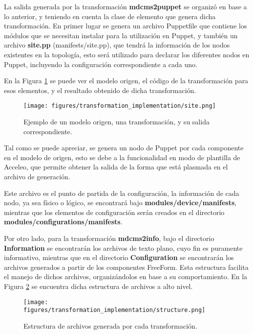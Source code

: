 La salida generada por la transformación \textbf{mdcms2puppet} se organizó en base a lo anterior, y teniendo en cuenta la clase de elemento que genera dicha transformación. En primer lugar se genera un archivo Puppetfile que contiene los módulos que se necesitan instalar para la utilización en Puppet, y también un archivo \textbf{site.pp} (manifests/site.pp), que tendrá la información de los nodos existentes en la topología, esto será utilizado para declarar los diferentes nodos en Puppet, incluyendo la configuración correspondiente a cada uno.

En la Figura \ref{fig:transformation:site} se puede ver el modelo origen, el código de la transformación para esos elementos, y el resultado obtenido de dicha transformación.

\begin{figure}[htbp]
    \centering
    \texttt{[image: figures/transformation\_implementation/site.png]}
    \caption{Ejemplo de un modelo origen, una transformación, y su salida correspondiente.}
    \label{fig:transformation:site}
\end{figure}

Tal como se puede apreciar, se genera un nodo de Puppet por cada componente en el modelo de origen, esto se debe a la funcionalidad en modo de plantilla de Acceleo, que permite obtener la salida de la forma que está plasmada en el archivo de generación.

Este archivo es el punto de partida de la configuración, la información de cada nodo, ya sea físico o lógico, se encontrará bajo \textbf{modules/device/manifests}, mientras que los elementos de configuración serán creados en el directorio \textbf{modules/configurations/manifests}.

Por otro lado, para la transformación \textbf{mdcms2info}, bajo el directorio \textbf{Information} se encontrarán los archivos de texto plano, cuyo fin es puramente informativo, mientras que en el directorio \textbf{Configuration} se encontrarán los archivos generados a partir de los componentes FreeForm. Esta estructura facilita el manejo de dichos archivos, organizándolos en base a su comportamiento. En la Figura \ref{fig:transformation:structure} se encuentra dicha estructura de archivos a alto nivel.

\begin{figure}[htbp]
    \centering
    \texttt{[image: figures/transformation\_implementation/structure.png]}
    \caption{Estructura de archivos generada por cada transformación.}
    \label{fig:transformation:structure}
\end{figure}

